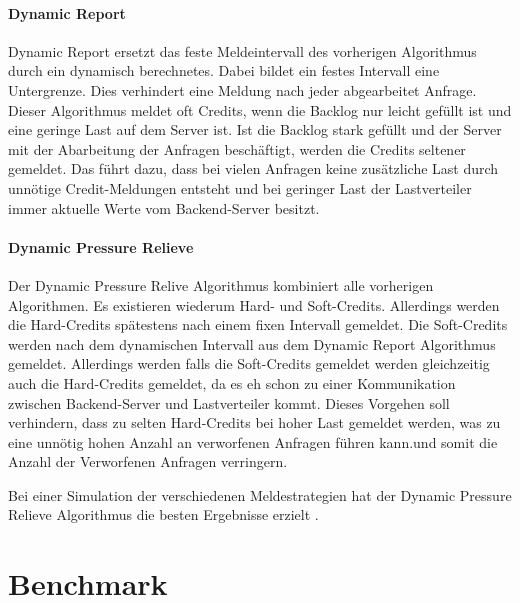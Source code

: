 \documentclass[a4paper, 12pt, BCOR10mm, DIV12, toc=bibliography, toc=listof, german]{scrbook}
\begin{document}
			\paragraph{Dynamic Report} %
			\label{par:dynamic-report}

			Dynamic Report ersetzt das feste Meldeintervall des vorherigen Algorithmus durch ein dynamisch
			berechnetes. Dabei bildet ein festes Intervall eine Untergrenze. Dies verhindert eine Meldung nach
			jeder abgearbeitet Anfrage. Dieser Algorithmus meldet oft Credits, wenn die Backlog nur leicht
			gefüllt ist und eine geringe Last	auf dem Server ist. Ist die Backlog stark gefüllt und der
			Server mit der Abarbeitung der Anfragen beschäftigt, werden die Credits seltener gemeldet. Das
			führt dazu, dass bei vielen Anfragen keine zusätzliche Last durch unnötige Credit-Meldungen entsteht
			und bei geringer Last der Lastverteiler immer aktuelle Werte vom Backend-Server besitzt.


			\paragraph{Dynamic Pressure Relieve} %
			\label{par:dynamic-pressure-relieve}

			Der Dynamic Pressure Relive Algorithmus kombiniert alle vorherigen Algorithmen. Es existieren
			wiederum Hard- und Soft-Credits. Allerdings werden die Hard-Credits spätestens nach einem fixen
			Intervall gemeldet. Die Soft-Credits werden nach dem dynamischen Intervall aus dem Dynamic Report
			Algorithmus gemeldet. Allerdings werden falls die Soft-Credits gemeldet werden gleichzeitig auch
			die Hard-Credits gemeldet, da es eh schon zu einer Kommunikation zwischen Backend-Server und
			Lastverteiler kommt. Dieses Vorgehen soll verhindern, dass zu selten Hard-Credits bei hoher Last
			gemeldet werden, was zu eine unnötig hohen Anzahl an verworfenen Anfragen führen kann.und somit die Anzahl der Verworfenen Anfragen verringern.


			Bei einer Simulation der verschiedenen Meldestrategien hat der Dynamic Pressure Relieve
			Algorithmus die besten Ergebnisse erzielt \cite{scsczile2008}.


		\section{Benchmark} %
		\label{sec:Benchmark}
\end{document}
